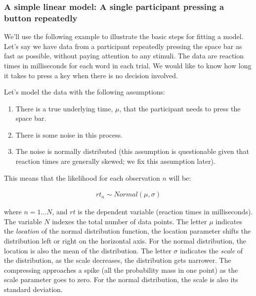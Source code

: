 \documentclass[12pt,]{krantz}
\providecommand{\tightlist}{%
  \setlength{\itemsep}{0pt}\setlength{\parskip}{0pt}}
\theoremstyle{definition}
\theoremstyle{definition}
\theoremstyle{definition}
\theoremstyle{remark}
\begin{document}
\hypertarget{sec:simplenormal}{%
\subsubsection{A simple linear model: A single participant pressing a button repeatedly}\label{sec:simplenormal}}

We'll use the following example to illustrate the basic steps for fitting a model. Let's say we have data from a participant repeatedly pressing the space bar as fast as possible, without paying attention to any stimuli. The data are reaction times in milliseconds for each word in each trial. We would like to know how long it takes to press a key when there is no decision involved.

Let's model the data with the following assumptions:

\begin{enumerate}
\def\labelenumi{\arabic{enumi}.}
\tightlist
\item
  There is a true underlying time, \(\mu\), that the participant needs to press the space bar.
\item
  There is some noise in this process.
\item
  The noise is normally distributed (this assumption is questionable given that reaction times are generally skewed; we fix this assumption later).
\end{enumerate}

This means that the likelihood for each observation \(n\) will be:

\begin{equation}
\begin{aligned}
rt_n \sim Normal(\mu, \sigma)
\end{aligned}
\label{eq:rtlik}
\end{equation}

where \(n =1 \ldots N\), and \(rt\) is the dependent variable (reaction times in milliseconds). The variable \(N\) indexes the total number of data points. The letter \(\mu\) indicates the \emph{location} of the normal distribution function, the location parameter shifts the distribution left or right on the horizontal axis. For the normal distribution, the location is also the mean of the distribution. The letter \(\sigma\) indicates the \emph{scale} of the distribution, as the scale decreases, the distribution gets narrower. The compressing approaches a spike (all the probability mass in one point) as the scale parameter goes to zero. For the normal distribution, the scale is also its standard deviation.
\end{document}
